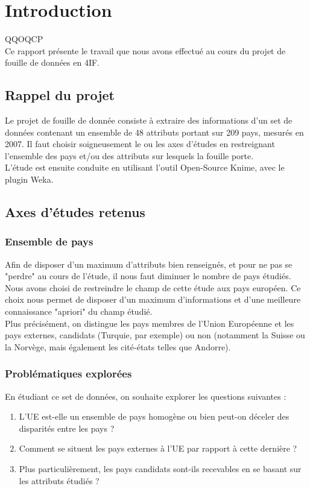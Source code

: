 \section{Introduction}

QQOQCP\\

Ce rapport présente le travail que nous avons effectué au cours du projet
de fouille de données en 4IF.


\subsection{Rappel du projet}

Le projet de fouille de donnée consiste à extraire des informations d'un
set de données contenant un ensemble de 48 attributs portant sur 209 pays,
mesurés en 2007. Il faut choisir soigneusement le ou les axes d'études en
restreignant l'ensemble des pays et/ou des attributs sur lesquels la
fouille porte.\\
L'étude est ensuite conduite en utilisant l'outil Open-Source Knime, avec
le plugin Weka.


\subsection{Axes d'études retenus}

\subsubsection{Ensemble de pays}
Afin de disposer d'un maximum d'attributs bien renseignés, et pour ne pas
se "perdre" au cours de l'étude, il nous faut diminuer le nombre de pays
étudiés.\\
Nous avons choisi de restreindre le champ de cette étude aux pays européen.
Ce choix nous permet de disposer d'un maximum d'informations et d'une
meilleure connaissance "apriori" du champ étudié.\\
Plus précisément, on distingue les pays membres de l'Union Européenne et
les pays externes, candidats (Turquie, par exemple) ou non (notamment la
Suisse ou la Norvège, mais également les cité-états telles que Andorre).\\

\subsubsection{Problématiques explorées}
En étudiant ce set de données, on souhaite explorer les questions suivantes
:
\begin{enumerate}
\item L'UE est-elle un ensemble de pays homogène ou bien peut-on déceler
des disparités entre les pays ?
\item Comment se situent les pays externes à l'UE par rapport à cette
dernière ?
\item Plus particulièrement, les pays candidats sont-ils recevables en se
basant sur les attributs étudiés ?
\end{enumerate}

